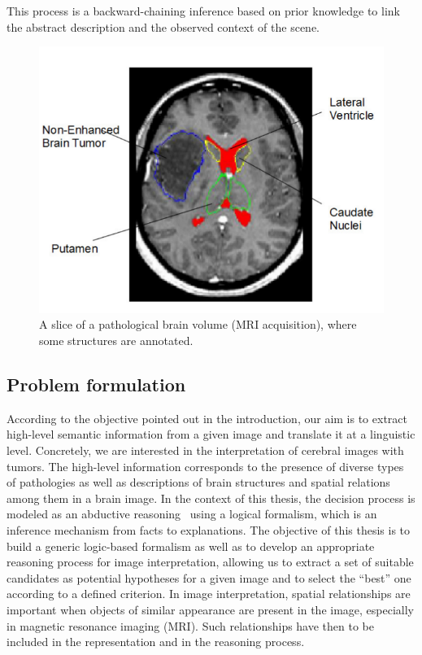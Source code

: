 \documentclass{article}
\begin{document}
 This process is a backward-chaining inference based on  prior knowledge to link the abstract description and the observed context of the scene.
  \begin{figure}[h]
  \centering
   \includegraphics[scale=.2]{./figures/patho_brain.png}
   \caption{\label{fig:patho_brain} A slice of a pathological brain volume (MRI acquisition), where some structures are annotated.}
 \end{figure} 
\subsection{Problem formulation}
According to the objective pointed out in the introduction, our aim is to extract high-level semantic information from a given image and translate it at a linguistic level.
Concretely, we are interested in the interpretation of cerebral images with tumors. The high-level information corresponds to the presence of diverse types of pathologies
 as well as descriptions of brain structures and spatial relations among them in a brain image. 
 In the context of this thesis, the decision process is modeled as an abductive reasoning~\cite{aliseda1997seeking} using a logical formalism, 
 which is an inference mechanism from facts to explanations.
The objective of this thesis is to build a generic logic-based formalism as well as  to develop an appropriate reasoning process for image interpretation, 
 allowing us to extract a set of suitable candidates as potential hypotheses for a given image and to select the ``best'' one according to a defined criterion.  
 In image interpretation, spatial relationships are important when objects of similar appearance are present in the image, especially in magnetic resonance imaging (MRI).
 Such relationships have then to be included in the representation and in the reasoning process.
\end{document}
